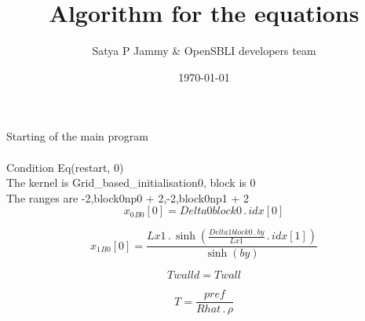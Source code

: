 \documentclass{article}
\title{Algorithm for the equations}
\author{Satya P Jammy \& OpenSBLI developers team}
\date{\today}
\begin{document}
\maketitle
\noindent Starting of the main program\\
\\\noindent Condition Eq(restart, 0)\\\noindent The kernel is Grid_based_initialisation0, block is 0\\\noindent The ranges are -2,block0np0 + 2,-2,block0np1 + 2\\\begin{dmath}{x_{0}{_{B0}}}[{0}] = Delta0block0 \,.\, {idx}[{0}]\end{dmath}

\begin{dmath}{x_{1}{_{B0}}}[{0}] = \frac{Lx1 \,.\, \sinh{\left (\frac{Delta1block0 \,.\, by}{Lx1} \,.\, {idx}[{1}] \right )}}{\sinh{\left (by \right )}}\end{dmath}

\begin{dmath}Twalld = Twall\end{dmath}

\begin{dmath}T = \frac{pref}{Rhat \,.\, \rho}\end{dmath}
\end{document}
